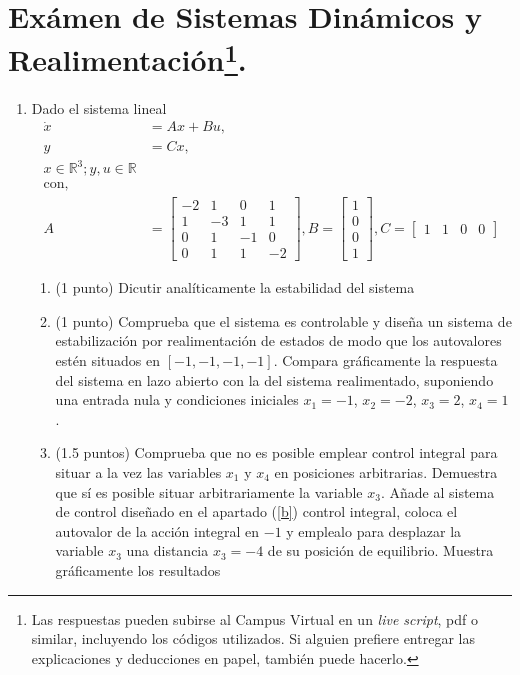 \documentclass[10pt,a4paper]{article}
\begin{document}
\thispagestyle{fancy}

\section*{Exámen de Sistemas Dinámicos y Realimentación\footnote{Las respuestas pueden subirse al Campus Virtual en un \emph{live script}, pdf o similar, incluyendo los códigos utilizados. Si alguien prefiere entregar las explicaciones y deducciones en papel, también puede hacerlo.}.}

\begin{enumerate}
\item Dado el sistema lineal
\begin{align*}
\dot{x} &= Ax+Bu, \\
y &= Cx, \\
x \in \mathbb{R}^3; y,u \in \mathbb{R}\\
\text{con,}\\
A &=\begin{bmatrix}
-2& 1& 0& 1\\
 1& -3 &1 &1\\
 0& 1 &-1 &0\\
 0& 1 &1 &-2
\end{bmatrix}, B=\begin{bmatrix}
1\\
0\\
0\\
1
\end{bmatrix},
C = \begin{bmatrix}
 1&1&0&0
\end{bmatrix}
\end{align*}
\begin{enumerate}
\item (1 punto) Dicutir analíticamente la estabilidad del sistema

\item \label{b} (1 punto) Comprueba que el sistema es controlable y diseña un sistema de estabilización por realimentación de estados de modo que los autovalores estén situados en $[-1, -1, -1, -1]$. Compara gráficamente la respuesta del sistema en lazo abierto con la del sistema realimentado, suponiendo una entrada nula y condiciones iniciales $x_1=-1$, $x_2=-2$, $x_3=2$, $x_4=1$. 

\item \label{c} (1.5 puntos) Comprueba que no es posible emplear control integral para situar a la vez las variables $x_1$ y $x_4$ en posiciones arbitrarias. Demuestra que sí es posible situar arbitrariamente la variable $x_3$. Añade al sistema de control diseñado en el apartado (\ref{b}) control integral, coloca el autovalor de la acción integral en $-1$ y emplealo para desplazar la variable $x_3$ una distancia $x_3 = -4$ de su posición de equilibrio. Muestra gráficamente los resultados



\end{enumerate}
\end{enumerate}
\end{document}
